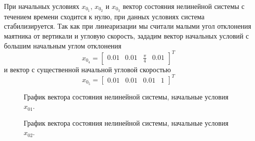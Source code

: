 При начальных условиях $x_{0_1}$, $x_{0_2}$ и $x_{0_3}$ вектор состояния нелинейной системы с течением времени сходится к нулю, при данных условиях система стабилизируется. Так как при линеаризации мы считали малыми угол отклонения маятника от вертикали и угловую скорость, зададим вектор начальных условий с большим начальным углом отклонения $$x_{0_4} = \begin{bmatrix}
   0.01 & 0.01 & \frac{\pi}{4} & 0.01 
\end{bmatrix}^T$$ и вектор с существенной начальной угловой скоростью $$x_{0_5} = \begin{bmatrix}
    0.01 & 0.01 & 0.01& 1
\end{bmatrix}^T$$



\begin{figure}[!h]
\caption{График вектора состояния нелинейной системы, начальные условия $x_{01}$.}
\label{3_x_nlin_01_lg}
\end{figure}


\begin{figure}[!h]
\caption{График вектора состояния нелинейной системы, начальные условия $x_{02}$.}
\label{3_x_nlin_02_lg}
\end{figure}


